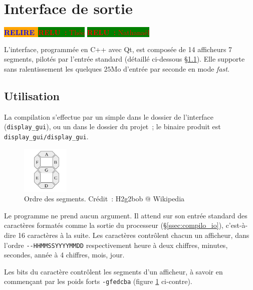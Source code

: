 \documentclass[11pt,a4paper]{article}
\newcommand{\relire}{\colorbox{orange}{\textcolor{blue}{\textbf{RELIRE}~}}}
\newcommand{\relu}[1]{\colorbox{green}{\textcolor{red}{\textbf{RELU~:} #1}}}
\begin{document}
\section{Interface de sortie} \label{sec:gui}

\relire \relu{Théo}
\relu{Nathanaël}

L'interface, programmée en C++ avec Qt, est composée de 14 afficheurs 7 segments, pilotés par l'entrée standard (détaillé ci-dessous §\ref{ssec:gui_use}). Elle supporte sans ralentissement les quelques $25\text{Mo}$ d'entrée par seconde en mode \emph{fast}.

\subsection{Utilisation} \label{ssec:gui_use}

La compilation s'effectue par un simple  dans le dossier de l'interface (\texttt{display\_gui}), ou un  dans le dossier du projet~; le binaire produit est \texttt{display\_gui/display\_gui}.

\begin{figure}
\begin{center}
\vspace{-1em}
\includegraphics[width=0.2\textwidth]{imgs/7seg-labels.png}
\end{center}
\vspace{-2em}
\caption{Ordre des segments. Crédit~: H2g2bob @ Wikipedia}
\label{fig:segorder}
\end{figure}

Le programme ne prend aucun argument. Il attend sur son entrée standard des caractères formatés comme la sortie du processeur (§\ref{ssec:compilo_io}), c'est-à-dire 16 caractères à la suite. Les caractères contrôlent chacun un afficheur, dans l'ordre \verb!--HHMMSSYYYYMMDD! respectivement heure à deux chiffres, minutes, secondes, année à 4 chiffres, mois, jour.

Les bits du caractère contrôlent les segments d'un afficheur, à savoir en commençant par les poids forts \verb!-gfedcba! (figure \ref{fig:segorder} ci-contre).
\end{document}
